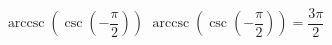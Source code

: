  {$\operatorname{arccsc}\left(\csc\left(-\dfrac{\pi}{2} \right) \right)$ }
{ $\operatorname{arccsc}\left(\csc\left(-\dfrac{\pi}{2} \right) \right) = \dfrac{3\pi}{2}$ }
